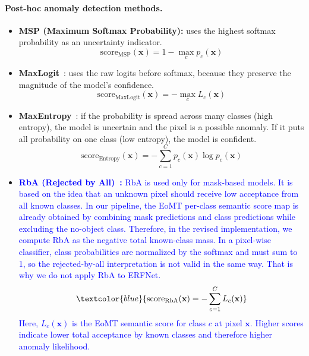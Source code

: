 \paragraph{Post-hoc anomaly detection methods.}
\begin{itemize}
    \item \textbf{MSP (Maximum Softmax Probability):} uses the highest softmax probability as an uncertainty indicator.
    \begin{equation}
    \text{score}_{\text{MSP}}(\mathbf{x}) = 1 - \max_c p_c(\mathbf{x})
    \end{equation}
    
    \item \textbf{MaxLogit}~\cite{maxlogit}: uses the raw logits before softmax, because they preserve the magnitude of the model's confidence.
    \begin{equation}
    \text{score}_{\text{MaxLogit}}(\mathbf{x}) = -\max_c L_c(\mathbf{x})
    \end{equation}
    
    \item \textbf{MaxEntropy}~\cite{maxentropy}: if the probability is spread across many classes (high entropy), the model is uncertain and the pixel is a possible anomaly. If it puts all probability on one class (low entropy), the model is confident.
    \begin{equation}
    \text{score}_{\text{Entropy}}(\mathbf{x}) = -\sum_{c=1}^{C} p_c(\mathbf{x}) \log p_c(\mathbf{x})
    \end{equation}
    
 \item \textbf{\textcolor{blue}{RbA (Rejected by All)~\cite{rba}:}} \textcolor{blue}{RbA is used only for mask-based models. It is based on the idea that an   unknown pixel should receive low acceptance from all known classes. In our pipeline, the EoMT per-class semantic score map is already obtained by combining mask predictions and class predictions while excluding the no-object class. Therefore, in the revised implementation, we compute RbA as the negative total known-class mass.}
\textcolor{blue}{In a pixel-wise classifier, class probabilities are normalized by the softmax and must sum to 1, so the rejected-by-all interpretation is not valid in the same way. That is why we do not apply RbA to ERFNet.}
\begin{equation}
\textcolor{blue}{
\text{score}_{\text{RbA}}(\mathbf{x}) = -\sum_{c=1}^{C} L_c(\mathbf{x})
}
\end{equation}
\textcolor{blue}{Here, \(L_c(\mathbf{x})\) is the EoMT semantic score for class \(c\) at pixel \(\mathbf{x}\). Higher scores indicate lower total acceptance by known classes and therefore higher anomaly likelihood.}
\end{itemize}


